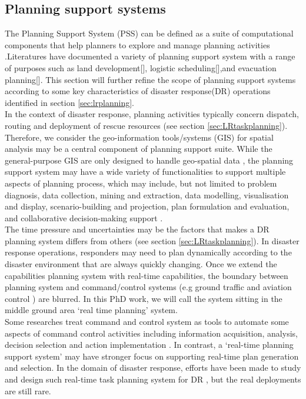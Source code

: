 \subsection{Planning support systems}
The Planning Support System (PSS) can be defined as a suite of computational components that help planners to explore and manage planning activities \cite{Geertman2004}.Literatures have documented a variety of planning support system with a range of purposes such as land development[], logistic scheduling[],and evacuation planning[]. This section will further refine the scope of planning support systems according to some key characteristics of disaster response(DR) operations identified in section \ref{sec:lrplanning}.\\

In the context of disaster response, planning activities  typically concern dispatch, routing and deployment of rescue resources (see section \ref{sec:LRtaskplanning}). Therefore, we consider the geo-information tools/systems (GIS) for spatial analysis may be a central component of planning support suite. While the general-purpose GIS  are only designed to handle geo-spatial data \cite{Geertman2004}, the planning support system may have a wide variety of functionalities to support multiple aspects of planning process, which may include, but not limited to problem diagnosis, data collection, mining and extraction, data modelling, visualisation and display, scenario-building and projection, plan formulation and evaluation, and collaborative decision-making support \cite{Geertman2004,Zerger2003}. \\

The time pressure and uncertainties may be the factors that makes a DR planning system differs from others (see section \ref{sec:LRtaskplanning}). In disaster response operations, responders may need to plan dynamically according to the disaster environment that are always quickly changing. Once we extend the capabilities planning system with real-time capabilities, the boundary between planning system and command/control systems (e.g ground traffic and aviation control \cite{Sharples2011}) are blurred. In this PhD work, we will call the system sitting in the middle ground area `real time planning' system.\\

Some researches treat command and control system as tools to automate some aspects of command control activities including information acquisition, analysis, decision selection and action implementation \cite{Sharples2011}.  In contrast, a `real-time planning support system' may have stronger focus on supporting real-time plan generation and selection. In the domain of disaster response, efforts have been made to study and design such real-time task planning system for DR \cite{Wagner2004,Okaya}, but the real deployments are still rare.\\

